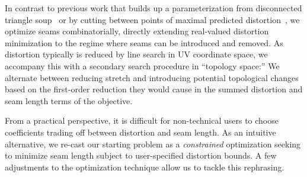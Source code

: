 In contrast to previous work that builds up a parameterization from disconnected triangle soup~\cite{Poranne2017Autocuts} or by cutting between points of maximal predicted distortion~\cite{Gu2002Geometry,Sheffer2002Seamster}, we optimize seams combinatorially, directly extending real-valued distortion minimization to the regime where seams can be introduced and removed. As distortion typically is reduced by line search in UV coordinate space, we accompany this with a secondary search procedure in ``topology space:'' We alternate between reducing stretch and introducing potential topological changes based on the first-order reduction they would cause in the summed distortion and seam length terms of the objective. %


From a practical perspective, it is difficult for non-technical users to choose coefficients trading off between distortion and seam length.  As an intuitive alternative, we re-cast our starting problem as a \emph{constrained} optimization seeking to minimize seam length subject to user-specified distortion bounds.  A few adjustments to the optimization technique allow us to tackle this rephrasing.

